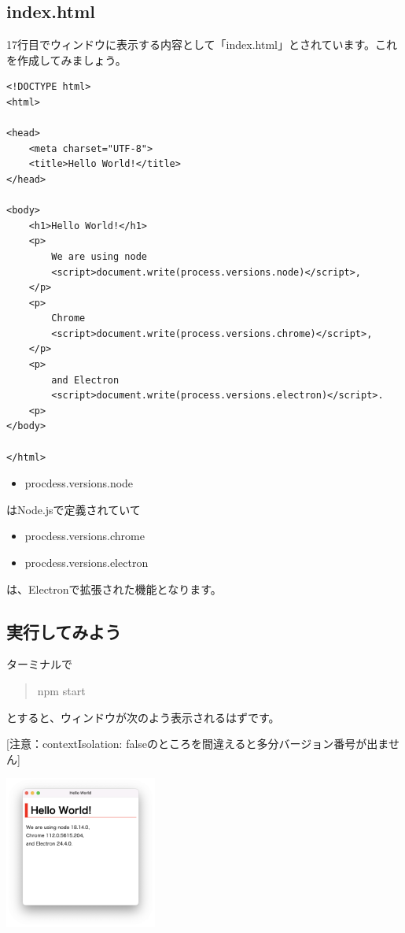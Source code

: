 \documentclass[mingoth,11pt,a4j,uplatex]{jsarticle}
\begin{document}
\subsection{index.html}
17行目でウィンドウに表示する内容として「index.html」とされています。これを作成してみましょう。

\begin{lstlisting}[caption=Hello World：index.html]
<!DOCTYPE html>
<html>

<head>
    <meta charset="UTF-8">
    <title>Hello World!</title>
</head>

<body>
    <h1>Hello World!</h1>
    <p>
        We are using node
        <script>document.write(process.versions.node)</script>,
    </p>
    <p>
        Chrome
        <script>document.write(process.versions.chrome)</script>,
    </p>
    <p>
        and Electron
        <script>document.write(process.versions.electron)</script>.
    <p>
</body>

</html>
\end{lstlisting}

\begin{itemize}
\item procdess.versions.node
\end{itemize}
はNode.jsで定義されていて
\begin{itemize}
\item procdess.versions.chrome
\item procdess.versions.electron
\end{itemize}
は、Electronで拡張された機能となります。

\subsection{実行してみよう}
ターミナルで
\begin{quote}
npm start
\end{quote}
とすると、ウィンドウが次のよう表示されるはずです。

[注意：contextIsolation: falseのところを間違えると多分バージョン番号が出ません]

\includegraphics[width=5cm]{img/helloworld.png}
\end{document}
